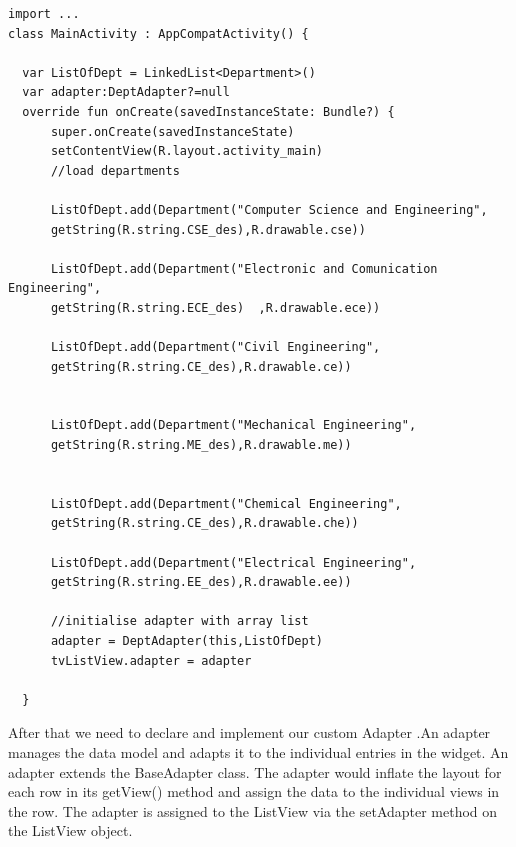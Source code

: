 \documentclass[11pt,a4paper]{report}
\begin{document}
\begin{lstlisting}[caption=MainActivity.kt]
import ...
class MainActivity : AppCompatActivity() {

  var ListOfDept = LinkedList<Department>()
  var adapter:DeptAdapter?=null
  override fun onCreate(savedInstanceState: Bundle?) {
      super.onCreate(savedInstanceState)
      setContentView(R.layout.activity_main)
      //load departments

      ListOfDept.add(Department("Computer Science and Engineering", 
      getString(R.string.CSE_des),R.drawable.cse))

      ListOfDept.add(Department("Electronic and Comunication Engineering",
      getString(R.string.ECE_des)  ,R.drawable.ece))
      
      ListOfDept.add(Department("Civil Engineering",
      getString(R.string.CE_des),R.drawable.ce))

      
      ListOfDept.add(Department("Mechanical Engineering",
      getString(R.string.ME_des),R.drawable.me))

      
      ListOfDept.add(Department("Chemical Engineering",
      getString(R.string.CE_des),R.drawable.che))

      ListOfDept.add(Department("Electrical Engineering",
      getString(R.string.EE_des),R.drawable.ee))

      //initialise adapter with array list
      adapter = DeptAdapter(this,ListOfDept)
      tvListView.adapter = adapter

  }
\end{lstlisting}


After that we need to declare and implement our custom Adapter .An adapter manages the data model and adapts it to the individual entries in the widget. An adapter extends the BaseAdapter class.
The adapter would inflate the layout for each row in its getView() method and assign the data to the individual views in the row.
The adapter is assigned to the ListView via the setAdapter method on the ListView object.
\end{document}
